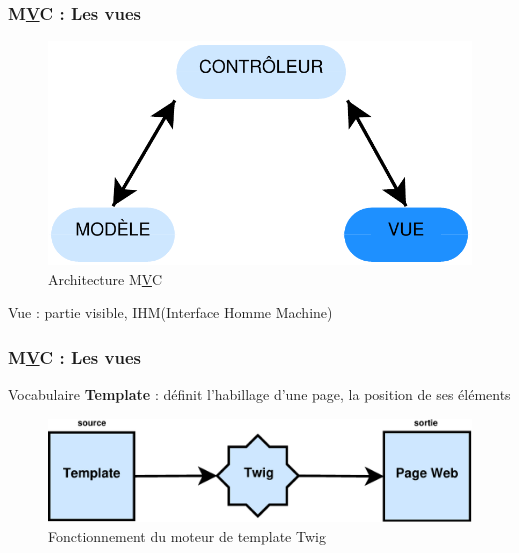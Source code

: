 \speaker{\Mathieu}

\begin{frame}
\frametitle{M\underline{V}C : Les vues}
\begin{figure}[!h]
	\begin{center}
	\includegraphics[scale=0.5]{images/mvcVue}
	\caption{Architecture M\underline{V}C}
	\end{center}
\end{figure}
Vue : partie visible, IHM(Interface Homme Machine)
\end{frame}

\begin{frame}
\frametitle{M\underline{V}C : Les vues}
\begin{block}{Vocabulaire}
\textbf{Template} : définit l'habillage d'une page, la position de ses éléments
\end{block}
\begin{figure}[!h]
	\begin{center}
	\includegraphics[scale=0.5]{images/twig}
	\caption{Fonctionnement du moteur de template Twig}
	\end{center}
\end{figure}
\end{frame}

